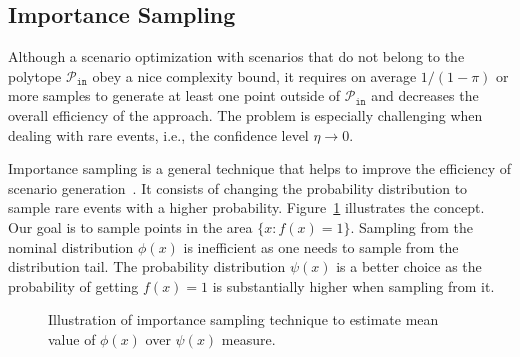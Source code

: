 \subsection{Importance Sampling}

Although a scenario optimization with scenarios that do not belong to the polytope $\mathcal{P}_{\texttt{in}}$ obey a nice complexity bound, it requires on average $1/(1-\pi)$ or more samples to generate at least one point outside of $\mathcal{P}_{\texttt{in}}$ and decreases the overall efficiency of the approach. The problem is especially challenging when dealing with rare events, i.e., the confidence level $\eta \to 0$. 

Importance sampling is a general technique that helps to improve the efficiency of scenario generation~\cite{tokdar2010importance}. It consists of changing the probability distribution to sample rare events with a higher probability. Figure~\ref{fig:20-dc} illustrates the concept. Our goal is to sample points in the area $\{x: f(x) = 1\}$. Sampling from the nominal distribution $\phi(x)$ is inefficient as one needs to sample from the distribution tail. The probability distribution $\psi(x)$ is a better choice as the probability of getting $f(x) = 1$ is substantially higher when sampling from it.



\begin{figure}[ht]
  \centering

\caption{Illustration of importance sampling technique to estimate mean value of $\phi(x)$ over $\psi(x)$ measure.}

  \label{fig:20-dc}
\end{figure}

